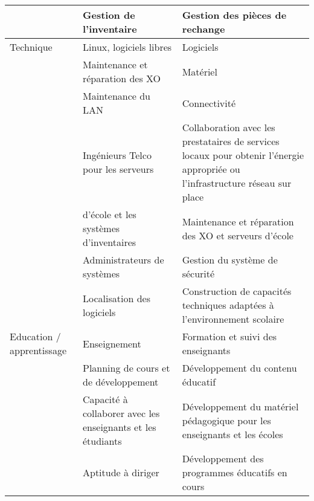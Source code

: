 \documentclass[11pt]{article}
\begin{document}
\begin{longtable}{|p{2cm}|p{5cm}|p{8cm}|}
                            &  Gestion de l’inventaire                                      &  Gestion des pièces de rechange                                                                                                  \\
\hline
 Technique                  &  Linux, logiciels libres                                      &  Logiciels                                                                                                                       \\
                            &  Maintenance et réparation des XO                             &  Matériel                                                                                                                        \\
                            &  Maintenance du LAN                                           &  Connectivité                                                                                                                    \\
                            &  Ingénieurs Telco pour les serveurs                           &  Collaboration avec les prestataires de services locaux pour obtenir l’énergie appropriée ou l'infrastructure  réseau sur place  \\
                            &  d’école et les systèmes d’inventaires                        &  Maintenance et réparation des XO et serveurs d'école                                                                            \\
                            &  Administrateurs de systèmes                                  &  Gestion du système de sécurité                                                                                                  \\
                            &  Localisation des logiciels                                   &  Construction de capacités techniques adaptées à l’environnement scolaire                                                        \\
\hline
 Education / apprentissage  &  Enseignement                                                 &  Formation et suivi des enseignants                                                                                              \\
                            &  Planning de cours et de développement                        &  Développement du contenu éducatif                                                                                               \\
                            &  Capacité à collaborer avec les enseignants et les étudiants  &  Développement du matériel pédagogique pour les enseignants et les écoles                                                        \\
                            &  Aptitude à diriger                                           &  Développement des programmes éducatifs en cours                                                                                 \\
\hline
\end{longtable}
\end{document}
